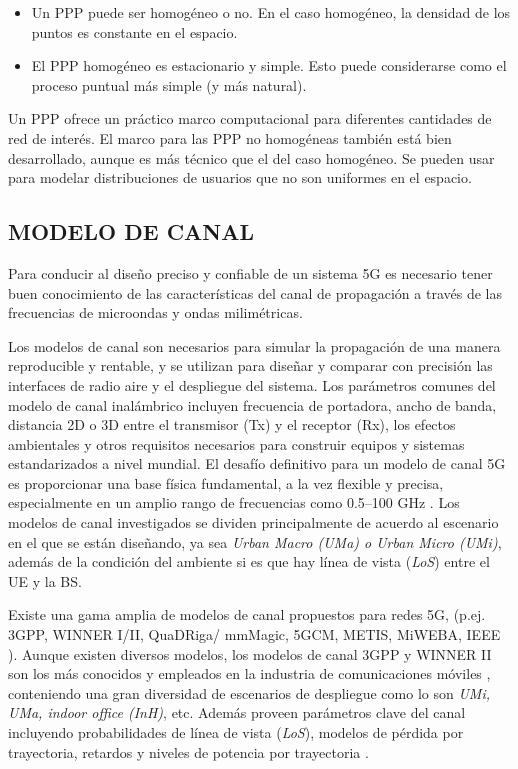 \begin{itemize}
    \item Un PPP puede ser homogéneo o no. En el caso homogéneo, la densidad de los puntos es constante en el espacio.
    \item El PPP homogéneo es estacionario y simple. Esto puede considerarse como el proceso puntual más simple (y más natural).
\end{itemize}

Un PPP ofrece un práctico marco computacional para diferentes cantidades de red de interés. El marco para las PPP no homogéneas también está bien desarrollado, aunque es más técnico que el del caso homogéneo. Se pueden usar para modelar distribuciones de usuarios que no son uniformes en el espacio.\newline


\subsection{MODELO DE CANAL}

Para conducir al diseño preciso y confiable de un sistema 5G es necesario tener buen conocimiento de las características del canal de propagación a través de las frecuencias de microondas y ondas milimétricas. \newline

Los modelos de canal son necesarios para simular la propagación de una manera reproducible y rentable, y se utilizan para diseñar y comparar con precisión las interfaces de radio aire y el despliegue del sistema. Los parámetros comunes del modelo de canal inalámbrico incluyen frecuencia de portadora, ancho de banda, distancia 2D o 3D entre el transmisor (Tx) y el receptor (Rx), los efectos ambientales y otros requisitos necesarios para construir equipos y sistemas estandarizados a nivel mundial. El desafío definitivo para un modelo de canal 5G es proporcionar una base física fundamental, a la vez flexible y precisa, especialmente en un amplio rango de frecuencias como 0.5--100 GHz \parencite{Rappaport2017}. Los modelos de canal investigados se dividen principalmente de acuerdo al escenario en el que se están diseñando, ya sea \textit{Urban Macro (UMa) o Urban Micro (UMi)}, además de la condición del ambiente si es que hay línea de vista (\textit{LoS}) entre el UE y la BS.\newline

Existe una gama amplia de modelos de canal propuestos para redes 5G, (p.ej. 3GPP, WINNER I/II, QuaDRiga/ mmMagic, 5GCM, METIS, MiWEBA, IEEE \parencite{WirelessSim}). Aunque existen diversos modelos, los modelos de canal 3GPP y WINNER II son los más conocidos y empleados en la industria de comunicaciones móviles \parencite{Sun2016}, conteniendo una gran diversidad de escenarios de despliegue como lo son \textit{UMi, UMa, indoor office (InH)}, etc. Además proveen parámetros clave del canal incluyendo probabilidades de línea de vista (\textit{LoS}), modelos de pérdida por trayectoria, retardos y niveles de potencia por trayectoria \parencite{Sun2016}. \newline

